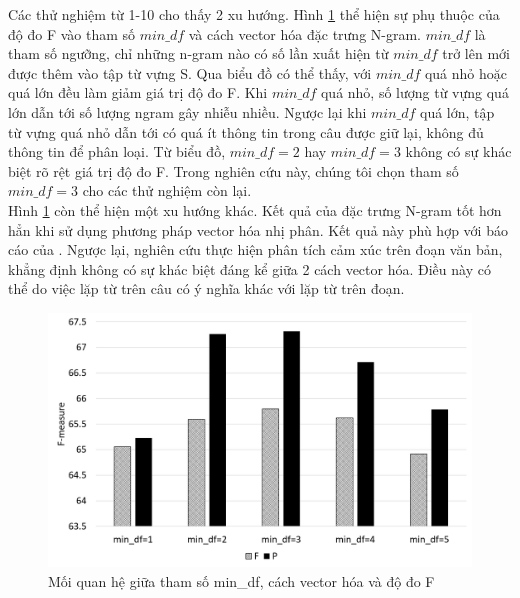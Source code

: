 Các thử nghiệm từ 1-10 cho thấy 2 xu hướng. Hình \ref{fig:mindf-p-f} thể hiện sự phụ thuộc của độ đo F vào tham số $min\_df$ và cách vector hóa đặc trưng N-gram. $min\_df$ là tham số ngưỡng, chỉ những n-gram nào có số lần xuất hiện từ $min\_df$ trở lên mới được thêm vào tập từ vựng S. Qua biểu đồ có thể thấy, với $min\_df$ quá nhỏ hoặc quá lớn đều làm giảm giá trị độ đo F. Khi $min\_df$ quá nhỏ, số lượng từ vựng quá lớn dẫn tới số lượng ngram gây nhiễu nhiều. Ngược lại khi $min\_df$ quá lớn, tập từ vựng quá nhỏ dẫn tới có quá ít thông tin trong câu được giữ lại, không đủ thông tin để phân loại. Từ biểu đồ, $min\_df=2$ hay $min\_df=3$ không có sự khác biệt rõ rệt giá trị độ đo F. Trong nghiên cứu này, chúng tôi chọn tham số $min\_df=3$ cho các thử nghiệm còn lại.\\

Hình \ref{fig:mindf-p-f} còn thể hiện một xu hướng khác. Kết quả của đặc trưng N-gram tốt hơn hẳn khi sử dụng phương pháp vector hóa nhị phân. Kết quả này phù hợp với báo cáo của \cite{pang2002thumbs}. Ngược lại, nghiên cứu \cite{sarker2011outcome} thực hiện phân tích cảm xúc trên đoạn văn bản, khẳng định không có sự khác biệt đáng kể giữa 2 cách vector hóa. Điều này có thể do việc lặp từ trên câu có ý nghĩa khác với lặp từ trên đoạn.\\

\begin{figure}[H]
\centering
\includegraphics[scale=0.25]{../hinh/mindf_p_f.png}
\caption{Mối quan hệ giữa tham số min\_df, cách vector hóa và độ đo F} \label{fig:mindf-p-f}
\end{figure}

